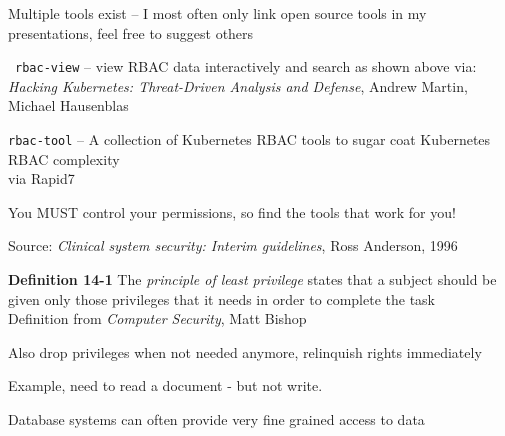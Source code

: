 \documentclass[Screen16to9,17pt]{foils}
\begin{document}






Multiple tools exist -- I most often only link open source tools in my presentations, feel free to suggest others
\begin{list2}
\item \faWrench\ \verb+rbac-view+ -- view RBAC data interactively and search as shown above
 via:\\
\emph{Hacking Kubernetes: Threat-Driven Analysis and Defense}, Andrew Martin, Michael Hausenblas

\item \faWrench \verb+rbac-tool+ -- A collection of Kubernetes RBAC tools to sugar coat Kubernetes RBAC complexity\\
 via Rapid7
\end{list2}

You MUST control your permissions, so find the tools that work for you!






Source:
\emph{Clinical system security: Interim guidelines}, Ross Anderson, 1996




\begin{list1}
\item {\bf Definition 14-1} The \emph{principle of least privilege} states that a subject should be given only those privileges that it needs in order to complete the task\\
Definition from \emph{Computer Security}, Matt Bishop
\item Also drop privileges when not needed anymore, relinquish rights immediately
\item Example, need to read a document - but not write.
\item Database systems can often provide very fine grained access to data
\end{list1}
\end{document}
